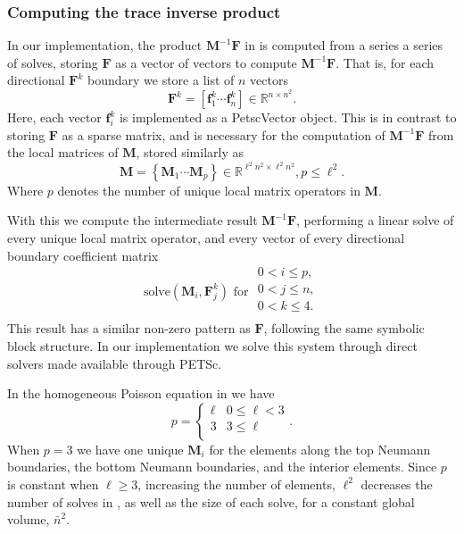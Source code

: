%
%
%
\subsubsection{Computing the trace inverse product}

%
%
%
\noindent
In our implementation, the product $\textbf{M}^{-1}\textbf{F}$ in  is computed from a series a series of solves, storing $\textbf{F}$ as a vector of vectors to compute $\textbf{M}^{-1}\textbf{F}$. 
That is, for each directional $\textbf{F}^k$ boundary we store a list of $n$ vectors
\begin{equation}
	\textbf{F}^k = \left[\textbf{f}^k_1 \cdots \textbf{f}^k_n\right] 
	\in \mathbb{R}^{n \times n^2}.
\end{equation} 
\noindent
Here, each vector $\textbf{f}^k_i$ is implemented as a PetscVector object.
This is in contrast to storing $\textbf{F}$ as a sparse matrix, and is necessary for the computation of $\textbf{M}^{-1}\textbf{F}$ from the local 
matrices of $\textbf{M}$, stored similarly as
\begin{equation}
	\textbf{M} = \left\{\textbf{M}_1 \cdots \textbf{M}_p\right\} \in 
	\mathbb{R}^{\ell^2 n^2 \times \ell^2 n^2}, p \leq \ell^2.
\end{equation} 
\noindent 
Where $p$ denotes the number of unique local matrix operators in 
$\textbf{M}$. 

%
%
%
With this we compute the intermediate result $\textbf{M}^{-1}\textbf{F}$, performing a linear solve of every unique local matrix operator, and every vector of every directional boundary coefficient matrix 
\begin{equation}
	\text{solve}(\textbf{M}_{i}, \textbf{F}^{k}_j) \text{  for }
	\begin{array}{l}
		0 < i \leq p, \\
		0 < j \leq n, \\
		0 < k \leq 4. \\ 
	\end{array}
	\label{eqn:mfsolves}
\end{equation}
\noindent
This result has a similar non-zero pattern as $\textbf{F}$, following the same symbolic block structure. 
In our implementation we solve this system through direct solvers made available through PETSc. 

%
%
%
\begin{aside}
	In the homogeneous Poisson equation in  we have 
	\begin{equation}
		p = \begin{cases}
		    \ell &  0 \leq \ell < 3 \\ 
			3 &  3 \leq \ell \\ 
		\end{cases}.
	\end{equation} 
	\noindent 
	When $p = 3$ we have one unique $\textbf{M}_i$ for the elements along the top Neumann boundaries, the bottom Neumann boundaries, and the interior elements. 
	Since $p$ is constant when $\ell \geq 3$, increasing the number of elements, $\ell^2$ decreases the number of solves in , as well as the size of each solve, for a constant global volume, $\bar{n}^2$. 
\end{aside}

